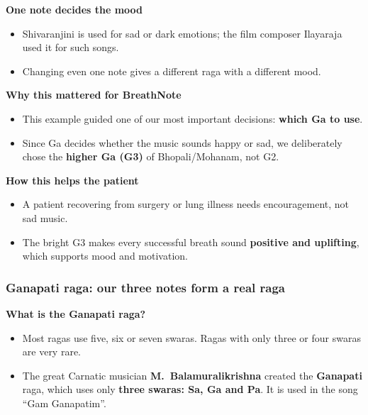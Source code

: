 \documentclass[12pt,a4paper]{article}
\begin{document}
\textbf{One note decides the mood}
\begin{itemize}
  \item Shivaranjini is used for sad or dark emotions; the film composer Ilayaraja used it for such songs.
  \item Changing even one note gives a different raga with a different mood.
\end{itemize}

\textbf{Why this mattered for BreathNote}
\begin{itemize}
  \item This example guided one of our most important decisions: \textbf{which Ga to use}.
  \item Since Ga decides whether the music sounds happy or sad, we deliberately chose the \textbf{higher Ga (G3)} of Bhopali/Mohanam, not G2.
\end{itemize}

\textbf{How this helps the patient}
\begin{itemize}
  \item A patient recovering from surgery or lung illness needs encouragement, not sad music.
  \item The bright G3 makes every successful breath sound \textbf{positive and uplifting}, which supports mood and motivation.
\end{itemize}

\subsubsection{Ganapati raga: our three notes form a real raga}
\textbf{What is the Ganapati raga?}
\begin{itemize}
  \item Most ragas use five, six or seven swaras. Ragas with only three or four swaras are very rare.
  \item The great Carnatic musician \textbf{M.~Balamuralikrishna} created the \textbf{Ganapati} raga, which uses only \textbf{three swaras: Sa, Ga and Pa}. It is used in the song ``Gam Ganapatim''.
\end{itemize}
\end{document}

